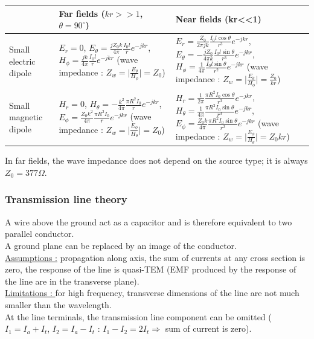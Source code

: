 \documentclass[../main.tex]{subfiles}
\begin{document}
\begin{table}[hbt!]
    \centering
    \begin{tabular}{p{}|p{}|p{}}
         & Far fields ($kr>>1$, $\theta = 90^\circ$) & Near fields (kr<<1) \\ \hline
        Small electric dipole & $E_r = 0$, $E_\theta = \frac{jZ_0 k}{4\pi} \frac{I_0 l}{r} e^{-jkr}$, $H_\phi = \frac{jk}{4\pi} \frac{I_0l}{r} e^{-jkr}$ (wave impedance : $Z_w = \lvert \frac{E_\theta}{H_\phi}\rvert = Z_0$) & $E_r = \frac{Z_0}{2\pi jk} \frac{I_0 l \cos \theta}{r^3} e^{-jkr}$, $E_\theta = -\frac{jZ_0}{4\pi k} \frac{I_0 l \sin \theta}{r^3} e^{-jkr}$, $H_\phi = \frac{1}{4\pi} \frac{I_0 l \sin \theta}{r^2} e^{-jkr}$ (wave impedance : $Z_w = \lvert \frac{E_\theta}{H_\phi}\rvert = \frac{Z_0}{kr}$) \\ \hline
        Small magnetic dipole & $H_r = 0$, $H_\theta = -\frac{k^2}{4\pi} \frac{\pi R^2 I_0}{r} e^{-jkr}$, $E_\phi = \frac{Z_0 k^2}{4\pi} \frac{\pi R^2 I_0}{r} e^{-jkr}$ (wave impedance : $Z_w = \lvert \frac{E_\phi}{H_\theta}\rvert = Z_0$) & $H_r = \frac{1}{2\pi} \frac{\pi R^2 I_0 \cos \theta}{r^3} e^{-jkr}$, $H_\theta = \frac{1}{4\pi} \frac{\pi R^2 I_0 \sin \theta}{r^3} e^{-jkr}$, $E_\phi = \frac{Z_0 k}{4\pi} \frac{\pi R^2 I_0 \sin \theta}{r^2} e^{-jkr}$ (wave impedance : $Z_w = \lvert \frac{E_\phi}{H_\theta}\rvert = Z_0 kr$)\\
    \end{tabular}
\end{table}
\warning In far fields, the wave impedance does not depend on the source type; it is always $Z_0 = 377\Omega$.\\

\subsubsection{Transmission line theory}
A wire above the ground act as a capacitor and is therefore equivalent to two parallel conductor. \\
\warning A ground plane can be replaced by an image of the conductor.\\

\underline{Assumptions :} propagation along axis, the sum of currents at any cross section is zero, the response of the line is quasi-TEM (EMF produced by the response of the line are in the transverse plane).\\
\underline{Limitations : }for high frequency, transverse dimensions of the line are not much smaller than the wavelength.\\
At the line terminals, the transmission line component can be omitted ($I_1 = I_a + I_t$, $I_2 = I_a - I_t$ : $I_1-I_2 = 2 I_t \Rightarrow$ sum of current is zero).\\
\end{document}
